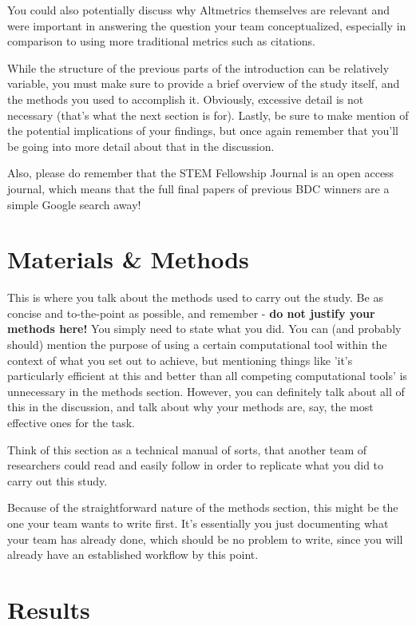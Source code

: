 You could also potentially discuss why Altmetrics themselves are relevant and were important in answering the question your team conceptualized, especially in comparison to using more traditional metrics such as citations.

While the structure of the previous parts of the introduction can be relatively variable, you must make sure to provide a brief overview of the study itself, and the methods you used to accomplish it. Obviously, excessive detail is not necessary (that's what the next section is for). Lastly, be sure to make mention of the potential implications of your findings, but once again remember that you'll be going into more detail about that in the discussion.

Also, please do remember that the STEM Fellowship Journal is an open access journal, which means that the full final papers of previous BDC winners are a simple Google search away!

\section{Materials \& Methods}

This is where you talk about the methods used to carry out the study. Be as concise and to-the-point as possible, and remember - \textbf{do not justify your methods here!} You simply need to state what you did. You can (and probably should) mention the purpose of using a certain computational tool within the context of what you set out to achieve, but mentioning things like 'it's particularly efficient at this and better than all competing computational tools' is unnecessary in the methods section. However, you can definitely talk about all of this in the discussion, and talk about why your methods are, say, the most effective ones for the task.

Think of this section as a technical manual of sorts, that another team of researchers could read and easily follow in order to replicate what you did to carry out this study.

Because of the straightforward nature of the methods section, this might be the one your team wants to write first. It's essentially you just documenting what your team has already done, which should be no problem to write, since you will already have an established workflow by this point.

\section{Results}


